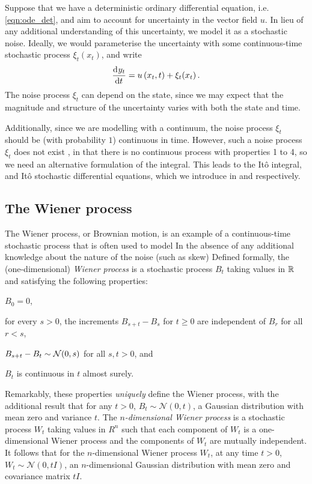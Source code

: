 Suppose that we have a deterministic ordinary differential equation, i.e. \cref{eqn:ode_det}, and aim to account for uncertainty in the vector field \(u\).
In lieu of any additional understanding of this uncertainty, we model it as a stochastic noise.
Ideally, we would parameterise the uncertainty with some continuous-time stochastic process \(\xi_t\!\left(x_t\right)\), and write
\[
	\dod{y_t}{t} = u\left(x_t, t\right) + \xi_t\!\left(x_t\right).
\]
The noise process \(\xi_t\) can depend on the state, since we may expect that the magnitude and structure of the uncertainty varies with both the state and time.


Additionally, since we are modelling with a continuum, the noise process \(\xi_t\) should be (with probability \(1\)) continuous in time.
However, such a noise process \(\xi_t\) does not exist \citep{Oksendal_2003_StochasticDifferentialEquations}, in that there is no continuous process with properties 1 to 4, so we need an alternative formulation of the integral.
This leads to the It\^o integral, and It\^o stochastic differential equations, which we introduce in  and  respectively.



\subsection{The Wiener process}
The Wiener process, or Brownian motion, is an example of a continuous-time stochastic process that is often used to model 
In the absence of any additional knowledge about the nature of the noise (such as skew)
Defined formally, the (one-dimensional) \emph{Wiener process} is a stochastic process \(B_t\) taking values in \(\mathbb{R}\) and satisfying the following properties:
\begin{romanate}
	\item \(B_0 = 0\),
	\item for every \(s > 0\), the increments \(B_{s + t} - B_{s}\) for \(t \geq 0\) are independent of \(B_r\) for all \(r < s\),
	\item \(B_{s + t} - B_t \sim\mathcal{N}\!\left(0, s\right)\) for all \(s,t > 0\), and
	\item \(B_t\) is continuous in \(t\) almost surely.
\end{romanate}
Remarkably, these properties \emph{uniquely} define the Wiener process, with the additional result that for any \(t > 0\), \(B_t \sim \mathcal{N}\left(0, t\right)\), a Gaussian distribution with mean zero and variance \(t\).
The \emph{\(n\)-dimensional Wiener process} is a stochastic process \(W_t\) taking values in \(R^n\) such that each component of \(W_t\) is a one-dimensional Wiener process and the components of \(W_t\) are mutually independent.
It follows that for the \(n\)-dimensional Wiener process \(W_t\), at any time \(t > 0\), \(W_t \sim \mathcal{N}\left(0, tI\right)\), an \(n\)-dimensional Gaussian distribution with mean zero and covariance matrix \(tI\).

